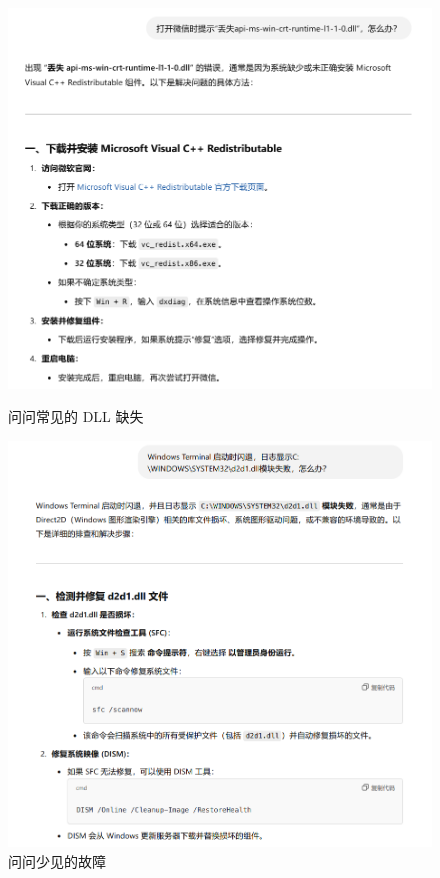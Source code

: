\begin{figure}[htb!]
  \centering
  \begin{minipage}{.5\textwidth}
    \centering
    \includegraphics[width=.95\textwidth]{assets/basic/Lose_MSVC.png}
    \caption{问问常见的 DLL 缺失}
    \label{fig:Lose_MSVC}
  \end{minipage}
  \begin{minipage}{.49\textwidth}
    \centering
    \includegraphics[width=.99\textwidth]{assets/basic/WT_D2D1_error.png}
    \caption{问问少见的故障}
    \label{fig:WT_D2D1_error}
  \end{minipage} 
\end{figure}


